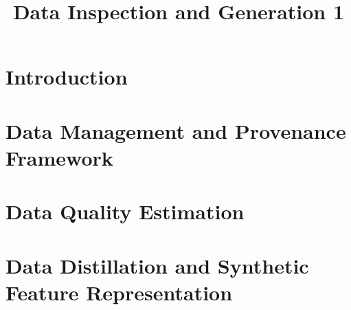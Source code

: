 \documentclass{article}
\title{Data Inspection and Generation 1}
\begin{document}
\maketitle

\section{Introduction}


\section{Data Management and Provenance Framework}


\section{Data Quality Estimation}


\section{Data Distillation and Synthetic Feature Representation}

\end{document}
